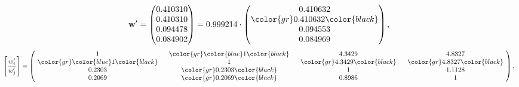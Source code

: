 \begin{example}
\begin{equation*}
\mathbf{w}^{\prime} =
\begin{pmatrix}
0.410310\\
0.410310\\
0.094478\\
0.084902
\end{pmatrix} =
0.999214\cdot
\begin{pmatrix}
0.410632\\
\color{gr} 0.410632\color{black} \\
0.094553\\
0.084969
\end{pmatrix},
\end{equation*}
\begin{equation*}
\left[ \frac{{w}^{\prime}_i}{{w}^{\prime}_j} \right] =
\begin{pmatrix}
$\,\,$ 1 $\,\,$ & $\,\,$\color{gr} \color{blue} 1\color{black} $\,\,$ & $\,\,$4.3429$\,\,$ & $\,\,$4.8327$\,\,$ \\
$\,\,$\color{gr} \color{blue} 1\color{black} $\,\,$ & $\,\,$ 1 $\,\,$ & $\,\,$\color{gr} 4.3429\color{black} $\,\,$ & $\,\,$\color{gr} 4.8327\color{black}   $\,\,$ \\
$\,\,$0.2303$\,\,$ & $\,\,$\color{gr} 0.2303\color{black} $\,\,$ & $\,\,$ 1 $\,\,$ & $\,\,$1.1128 $\,\,$ \\
$\,\,$0.2069$\,\,$ & $\,\,$\color{gr} 0.2069\color{black} $\,\,$ & $\,\,$0.8986$\,\,$ & $\,\,$ 1  $\,\,$ \\
\end{pmatrix},
\end{equation*}
\end{example}
\newpage
